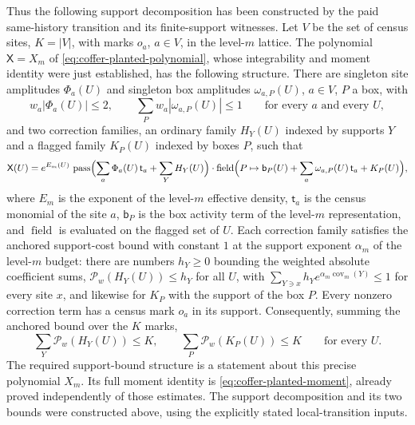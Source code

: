 Thus the following support decomposition has been constructed by the
paid same-history transition and its finite-support witnesses.
Let \(V\) be the set of census sites, \(K=|V|\), with marks \(o_a\),
\(a\in V\), in the level-\(m\) lattice. The polynomial $\mathsf X=X_m$ of
\eqref{eq:coffer-planted-polynomial}, whose integrability and moment
identity were just established, has the following structure. There are singleton site
amplitudes \(\Phi_a(U)\) and singleton box amplitudes \(\omega_{a,P}(U)\),
\(a\in V\), \(P\) a box, with
\[
 w_a|\Phi_a(U)|\leq2,\qquad \sum_P w_a|\omega_{a,P}(U)|\leq1
 \qquad\text{for every }a\text{ and every }U,
\]
and two correction families, an ordinary family \(H_Y(U)\) indexed by
supports \(Y\) and a flagged family \(K_P(U)\) indexed by boxes \(P\), such
that
\[
 \mathsf X(U)=e^{E_m(U)}\,
   \operatorname{pass}\Bigl(\sum_a\Phi_a(U)\,\mathsf t_a+\sum_YH_Y(U)\Bigr)
   \cdot\operatorname{field}\Bigl(P\mapsto
       \mathsf b_P(U)+\sum_a\omega_{a,P}(U)\,\mathsf t_a+K_P(U)\Bigr),
\]
where \(E_m\) is the exponent of the level-\(m\) effective density,
\(\mathsf t_a\) is the census monomial of the site \(a\), \(\mathsf b_P\)
is the box activity term of the level-\(m\) representation, and
\(\operatorname{field}\) is evaluated on the flagged set of \(U\). Each
correction family satisfies the anchored support-cost bound with constant
\(1\) at the support exponent \(\alpha_m\) of the level-\(m\) budget: there
are numbers \(h_Y\geq0\) bounding the weighted absolute coefficient sums,
\(\mathcal P_w(H_Y(U))\leq h_Y\) for all \(U\), with
\(\sum_{Y\ni x}h_Ye^{\alpha_m\operatorname{cov}_m(Y)}\leq1\) for every
site \(x\), and likewise for \(K_P\) with the support of the box \(P\).
Every nonzero correction term has a census mark \(o_a\) in its support.
Consequently, summing the anchored bound over the \(K\) marks,
\begin{equation}
 \sum_Y\mathcal P_w(H_Y(U))\leq K,\qquad
 \sum_P\mathcal P_w(K_P(U))\leq K
 \qquad\text{for every }U.
 \label{eq:ex-trace-coffer-corrections}
\end{equation}
The required support-bound structure is a statement about this precise
polynomial $X_m$. Its full moment identity is
\eqref{eq:coffer-planted-moment}, already proved independently of those
estimates. The support decomposition and its two bounds were constructed above,
using the explicitly stated local-transition inputs.

